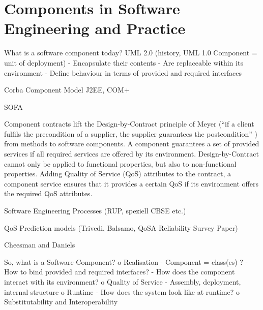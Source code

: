 \section{Components in Software Engineering and Practice}
\label{sec:ComponentsInSE}
What is a software component today?
UML 2.0 (history, UML 1.0 Component = unit of deployment)
-	Encapsulate their contents
-	Are replaceable within its environment
-	Define behaviour in terms of provided and required interfaces

Corba Component Model
J2EE, COM+

SOFA

Component contracts lift the Design-by-Contract principle of Meyer (``if a client fulfils the precondition of a supplier, the supplier guarantees the postcondition'' \cite{meyer1992a}) from methods to software components. A component guarantees a set of provided services if all required services are offered by its environment. Design-by-Contract cannot only be applied to functional properties, but also to non-functional properties. Adding Quality of Service (QoS) attributes to the contract, a component service ensures that it provides a certain QoS if its environment offers the required QoS attributes. 


Software Engineering Processes (RUP, speziell CBSE etc.)

QoS Prediction models (Trivedi, Balsamo, QoSA Reliability Survey Paper)

Cheesman and Daniels

So, what is a Software Component?
o	Realisation
-	Component = class(es) ?
-	How to bind provided and required interfaces?
-	How does the component interact with its environment?
o	Quality of Service
-	Assembly, deployment, internal structure
o	Runtime
-	How does the system look like at runtime?
o	Substitutability and Interoperability
